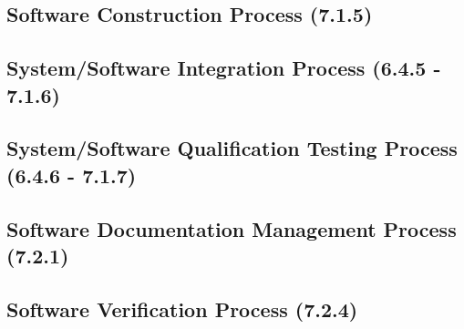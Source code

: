 	\subsection{Software Construction Process (7.1.5)}
	
	\subsection{System/Software Integration Process (6.4.5 - 7.1.6)}
	
	\subsection{System/Software Qualification Testing Process (6.4.6 - 7.1.7)}
	
	\subsection{Software Documentation Management Process (7.2.1)}
	
	\subsection{Software Verification Process (7.2.4)}
	